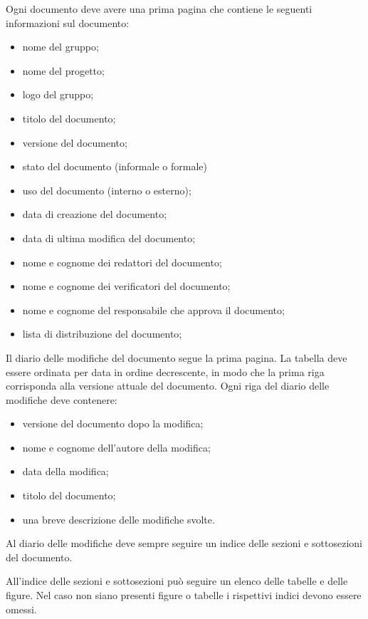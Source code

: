 \documentclass[12pt,a4paper]{article}
\begin{document}
Ogni documento deve avere una prima pagina che contiene le seguenti informazioni sul documento:
\begin{itemize}
	\item nome del gruppo;
	\item nome del progetto;
	\item logo del gruppo;
	\item titolo del documento;
	\item versione del documento;
	\item stato del documento (informale o formale)
	\item uso del documento (interno o esterno);
	\item data di creazione del documento;
	\item data di ultima modifica del documento;
	\item nome e cognome dei redattori del documento;
	\item nome e cognome dei verificatori del documento;
	\item nome e cognome del responsabile che approva il documento;
	\item lista di distribuzione del documento;     
\end{itemize}

Il diario delle modifiche del documento segue la prima pagina. La tabella deve essere ordinata per data in ordine decrescente, in modo che la prima riga corrisponda alla versione attuale del documento. Ogni riga del diario delle modifiche deve contenere:
\begin{itemize}
	\item versione del documento dopo la modifica;
	\item nome e cognome dell'autore della modifica;
	\item data della modifica;
	\item titolo del documento;
	\item una breve descrizione delle modifiche svolte.
\end{itemize}

Al diario delle modifiche deve sempre seguire un indice delle sezioni e sottosezioni del documento.

All'indice delle sezioni e sottosezioni può seguire un elenco delle tabelle e delle figure. Nel caso non siano presenti figure o tabelle i rispettivi indici devono essere omessi.
\end{document}
